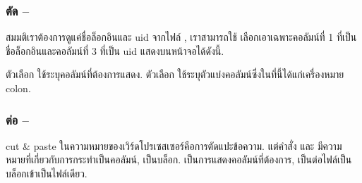 \begin{thwbr}
\subsubsection{ตัด -- }
สมมติเราต้องการดูแค่ชื่อล็อกอินและ uid จากไฟล์ , เราสามารถใช้  เลือกเอาเฉพาะคอลัมน์ที่ 1 ที่เป็นชื่อล็อกอินและคอลัมน์ที่ 3 ที่เป็น uid แสดงบนหน้าจอได้ดังนี้.
\begin{MyExample}
\end{MyExample}%
ตัวเลือก  ใช้ระบุคอลัมน์ที่ต้องการแสดง. ตัวเลือก  ใช้ระบุตัวแบ่งคอลัมน์ซึ่งในที่นี้ได้แก่เครื่องหมาย colon. 

\subsubsection{ต่อ -- }
cut \& paste ในความหมายของเวิร์ดโปรเซสเซอร์คือการตัดแปะข้อความ. แต่คำสั่ง  และ  มีความหมายที่เกี่ยวกับการกระทำเป็นคอลัมน์, เป็นบล็อก.  เป็นการแสดงคอลัมน์ที่ต้องการ,  เป็นต่อไฟล์เป็นบล็อกเข้าเป็นไฟล์เดียว.

\begin{figure}[!htb]
\end{figure}



\end{thwbr}
